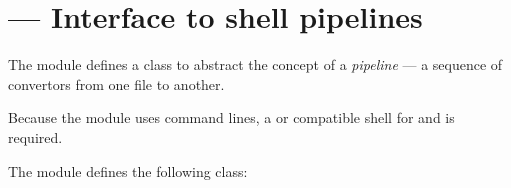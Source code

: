 \section{ ---
         Interface to shell pipelines}



The  module defines a class to abstract the concept of
a \emph{pipeline} --- a sequence of convertors from one file to 
another.

Because the module uses  command lines, a \POSIX{} or
compatible shell for  and 
is required.

The  module defines the following class:

